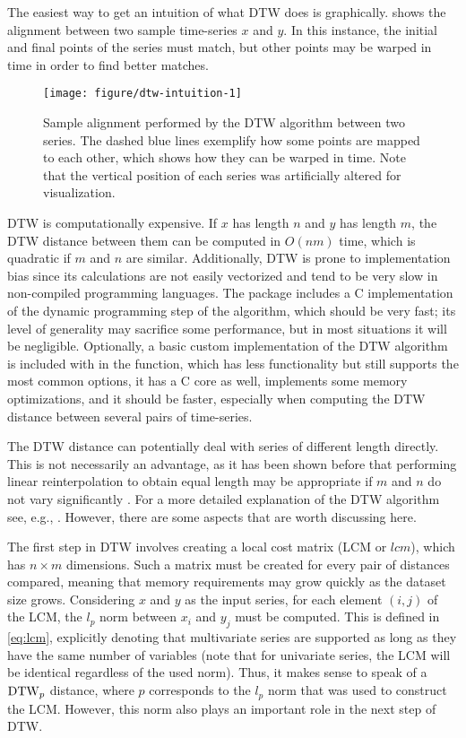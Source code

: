 The easiest way to get an intuition of what DTW does is graphically.
 shows the alignment between two sample time-series $x$ and $y$.
In this instance, the initial and final points of the series must match,
but other points may be warped in time in order to find better matches.

\begin{figure}[htbp]

{\centering \texttt{[image: figure/dtw-intuition-1]}

}

\caption{Sample alignment performed by the DTW algorithm between two series. The dashed blue lines exemplify how some points are mapped to each other, which shows how they can be warped in time. Note that the vertical position of each series was artificially altered for visualization.}\label{fig:dtw-intuition}
\end{figure}

DTW is computationally expensive.
If $x$ has length $n$ and $y$ has length $m$,
the DTW distance between them can be computed in $O(nm)$ time,
which is quadratic if $m$ and $n$ are similar.
Additionally, DTW is prone to implementation bias since its calculations are not easily vectorized and tend to be very slow in non-compiled programming languages.
The  package includes a C implementation of the dynamic programming step of the algorithm,
which should be very fast;
its level of generality may sacrifice some performance,
but in most situations it will be negligible.
Optionally, a basic custom implementation of the DTW algorithm is included with \dtwclust{} in the  function,
which has less functionality but still supports the most common options,
it has a C core as well,
implements some memory optimizations,
and it should be faster,
especially when computing the DTW distance between several pairs of time-series.

The DTW distance can potentially deal with series of different length directly.
This is not necessarily an advantage,
as it has been shown before that performing linear reinterpolation to obtain equal length may be appropriate if $m$ and $n$ do not vary significantly \citep{keogh2004}.
For a more detailed explanation of the DTW algorithm see, e.g., \citet{giorgino2009}.
However, there are some aspects that are worth discussing here.

The first step in DTW involves creating a local cost matrix (LCM  or $lcm$),
which has $n \times m$ dimensions.
Such a matrix must be created for every pair of distances compared,
meaning that memory requirements may grow quickly as the dataset size grows.
Considering $x$ and $y$ as the input series,
for each element $(i,j)$ of the LCM,
the $l_p$ norm between $x_i$ and $y_j$ must be computed.
This is defined in \cref{eq:lcm},
explicitly denoting that multivariate series are supported as long as they have the same number of variables
(note that for univariate series, the LCM will be identical regardless of the used norm).
Thus, it makes sense to speak of a $\text{DTW}_p{}$ distance,
where $p$ corresponds to the $l_p$ norm that was used to construct the LCM.
However, this norm also plays an important role in the next step of DTW.

